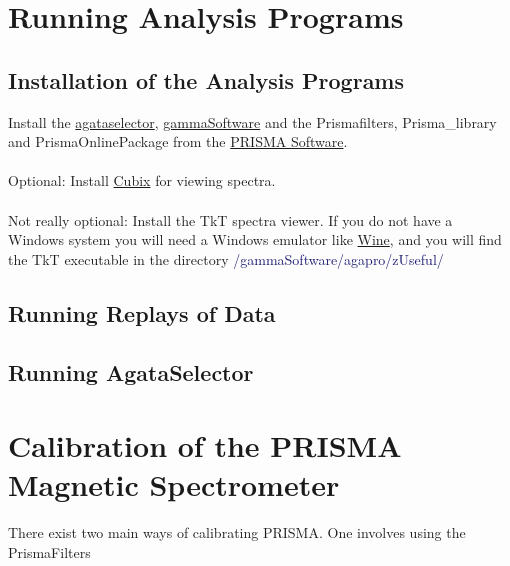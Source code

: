 \documentclass{article}
\begin{document}
\pagebreak


\section{Running Analysis Programs}

\subsection{Installation of the Analysis Programs}
Install the
\href{https://baltig.infn.it/gamma/agataselector}{agataselector},
\href{https://agata.pages.in2p3.fr/handbook/install-P1/install/}{gammaSoftware} and the Prismafilters, Prisma\_library and PrismaOnlinePackage from the 
\href{https://baltig.infn.it/prisma}{PRISMA Software}.
\\
\\
Optional:
Install \href{https://cubix.in2p3.fr/install/}{Cubix} for viewing spectra.
\\\\
Not really optional:
Install the TkT spectra viewer. If you do not have a Windows system you will need a Windows emulator like \href{https://gitlab.winehq.org/wine/wine/-/wikis/Download}{Wine}, and you will find the TkT executable in the directory \textcolor{MidnightBlue}{/gammaSoftware/agapro/zUseful/}

\subsection{Running Replays of Data}

\subsection{Running AgataSelector}


\pagebreak

\section{Calibration of the PRISMA Magnetic Spectrometer}
There exist two main ways of calibrating PRISMA.
One involves using the PrismaFilters 
\end{document}
